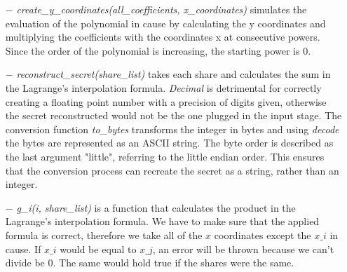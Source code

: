 \documentclass[12pt, a4paper, oneside]{book}
\begin{document}
    \vspace{-0.5cm}
    \begin{itemize}
        \item[$-$] {\it create\_y\_coordinates(all\_coefficients, x\_coordinates)} simulates the evaluation of the polynomial in cause by calculating the y coordinates and multiplying the coefficients with the coordinates x at consecutive powers. Since the order of the polynomial is increasing, the starting power is 0.
    \end{itemize}
    \vspace{-0.5cm}
    \begin{itemize}
        \item[$-$] {\it reconstruct\_secret(share\_list)} takes each share and calculates the sum in the Lagrange's interpolation formula. {\it Decimal} is detrimental for correctly creating a floating point number with a precision of digits given, otherwise the secret reconstructed would not be the one plugged in the input stage. The conversion function {\it to\_bytes} transforms the integer in bytes and using {\it decode} the bytes are represented as an ASCII string. The byte order is described as the last argument "little", referring to the little endian order. This ensures that the conversion process can recreate the secret as a string, rather than an integer. 
    \end{itemize}
    \vspace{-0.5cm}
    \begin{itemize}
        \item[$-$] {\it g\_i(i, share\_list)} is a function that calculates the product in the Lagrange's interpolation formula. We have to make sure that the applied formula is correct, therefore we take all of the $x$ coordinates except the $x\_i$ in cause. If $x\_i$ would be equal to $x\_j$, an error will be thrown because we can't divide be 0. The same would hold true if the shares were the same.
    \end{itemize}
    
\end{document}
